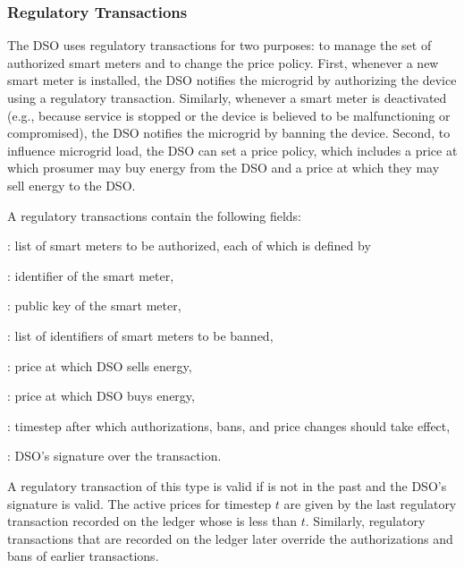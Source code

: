 \subsubsection{Regulatory Transactions}

The DSO uses regulatory transactions for two purposes: to manage the set of authorized smart meters and to change the price policy.
First, whenever a new smart meter is installed, the DSO notifies the microgrid by authorizing the device using a regulatory transaction.
Similarly, whenever a smart meter is deactivated (e.g., because service is stopped or the device is believed to be malfunctioning or compromised), the DSO notifies the microgrid by banning the device.
Second, to influence microgrid load, the DSO can set a price policy, which includes a price at which prosumer may buy energy from the DSO and a price at which they may sell energy to the DSO.

A regulatory transactions contain the following fields:
\begin{compactitem}
\item {}: list of smart meters to be authorized, each of which is defined by
\begin{compactitem}
\item {}: identifier of the smart meter,
\item {}: public key of the smart meter,
\end{compactitem}
\item {}: list of identifiers of smart meters to be banned, 
\item {}: price at which DSO sells energy,
\item {}: price at which DSO buys energy,
\item {}: timestep after which authorizations, bans, and price changes should take effect,
\item {}: DSO's signature over the transaction.
\end{compactitem}

A regulatory transaction of this type is valid if %
{} is not in the past and %
the DSO's signature is valid.
%
The active prices for timestep $t$ are given by the last regulatory transaction recorded on the ledger whose  is less than $t$.
Similarly, regulatory transactions that are recorded on the ledger later override the authorizations and bans of earlier transactions.

